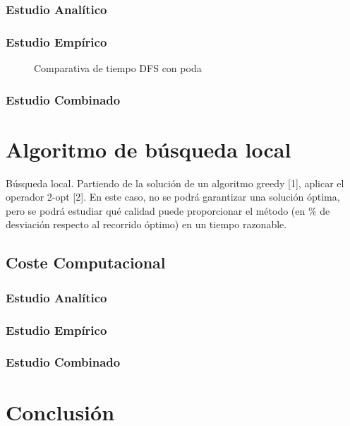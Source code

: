 \documentclass{uc3mpracticas}
\begin{document}
  \subsubsection{Estudio Analítico}

  \subsubsection{Estudio Empírico}
  
  \begin{figure}[!h]
    \caption{Comparativa de tiempo DFS con poda}
  \end{figure}

  \subsubsection{Estudio Combinado}




  \section{Algoritmo de búsqueda local}

  Búsqueda local. Partiendo de la solución de un algoritmo greedy [1], aplicar el operador 2-opt [2]. En este caso, no se podrá garantizar una solución óptima, pero se podrá estudiar qué calidad puede proporcionar el método (en \% de desviación respecto al recorrido óptimo) en un tiempo razonable.

  \subsection{Coste Computacional}
  
  \subsubsection{Estudio Analítico}

  \subsubsection{Estudio Empírico}

  \subsubsection{Estudio Combinado}

  \section{Conclusión}
  
\end{document}

